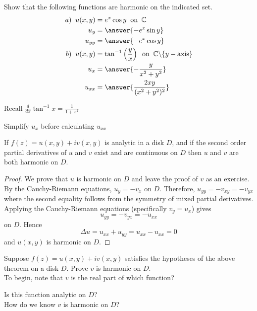 \documentclass[handout]{ximera}
\begin{document}
\begin{problem}
Show that the following functions are harmonic on the indicated set.\\
\begin{align*}
a) \;\; u(x,y) &= e^x\cos y \;\;\text{on} \;\; \C\\
u_y &= \answer{-e^x \sin y}\\
u_{yy} &= \answer{-e^x \cos y}\\
b) \;\; u(x,y) &= \tan^{-1}\left(\frac{y}{x}\right) \;\; \text{on} \;\; \C\backslash \{y-\text{axis}\}\\
u_x &= \answer{-\frac{y}{x^2+y^2}}\\
u_{xx} &= \answer{\frac{2xy}{(x^2+y^2)^2}}
\end{align*}
\begin{hint}
Recall $\frac{d}{dx} \tan^{-1} x = \frac{1}{1+x^2}$
\end{hint}
\begin{hint}
Simplify $u_x$ before calculating $u_{xx}$
\end{hint}



\end{problem}


\begin{theorem}
If $f(z) = u(x,y) + iv(x,y)$ is analytic in a disk $D$, and if the second order 
partial derivatives of $u$ and $v$ exist and are continuous on $D$ then $u$ and $v$ are both harmonic on $D$.
\end{theorem}
\begin{proof}
We prove that $u$ is harmonic on $D$ and leave the proof of $v$ as an exercise.\\
By the Cauchy-Riemann equations, $u_y = -v_x$ on $D$.  Therefore, $u_{yy} = -v_{xy} = -v_{yx}$ where the 
second equality follows from the symmetry of mixed partial derivatives. Applying the Cauchy-Riemann 
equations (specifically $v_y = u_x$)  gives
\[
u_{yy} = -v_{yx} = -u_{xx}
\]
on $D$. Hence
\[
\Delta u = u_{xx} + u_{yy} = u_{xx} - u_{xx} = 0
\]
and $u(x,y)$ is harmonic on $D$.
\end{proof}

\begin{problem}
Suppose $f(z) = u(x,y) + iv(x,y)$ satisfies the hypotheses of the above theorem on a disk $D$. 
Prove $v$ is harmonic on $D$.\\
To begin, note that $v$ is the real part of which function?
\begin{multipleChoice}
\end{multipleChoice}
Is this function analytic on $D$? \\
How do we know $v$ is harmonic on $D$? 
\end{problem}
  
\end{document}
